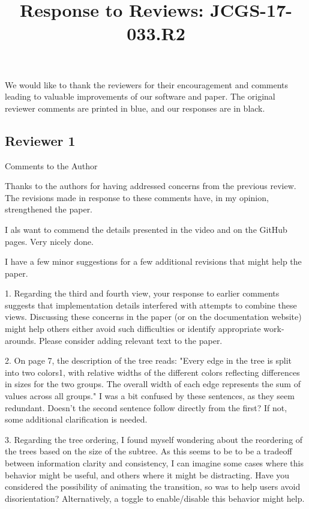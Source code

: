 \documentclass{article}
\title{Response to Reviews: JCGS-17-033.R2}
\begin{document}
\maketitle

We would like to thank the reviewers for their encouragement and comments
leading to valuable improvements of our software and paper. The original
reviewer comments are printed in blue, and our responses are in black.

\subsection{Reviewer 1}
\label{subsec:reviewer_1}

\color{blue}
Comments to the Author

Thanks to the authors for having addressed concerns from the previous review.
The revisions made in response to these comments have, in my opinion,
strengthened the paper.

I als want to commend the details presented in the video and on the GitHub
pages. Very nicely done.

I have a few minor suggestions for a few additional revisions that might help
the paper.

1. Regarding the third and fourth view, your response to earlier comments
suggests that implementation details interfered with attempts to combine these
views. Discussing these concerns in the paper (or on the documentation website)
might help others either avoid such difficulties or identify appropriate
work-arounds. Please consider adding relevant text to the paper.

\color{black}

\color{blue}
2. On page 7, the description of the tree reads: "Every edge in the tree is
split into two colors1, with relative widths of the different colors reflecting
differences in sizes for the two groups. The overall width of each edge
represents the sum of values across all groups." I was a bit confused by these
sentences, as they seem redundant. Doesn't the second sentence follow directly
from the first? If not, some additional clarification is needed.

\color{black}

\color{blue}
3. Regarding the tree ordering, I found myself wondering about the reordering of
the trees based on the size of the subtree. As this seems to be to be a tradeoff
between information clarity and consistency, I can imagine some cases where this
behavior might be useful, and others where it might be distracting. Have you
considered the possibility of animating the transition, so was to help users
avoid disorientation? Alternatively, a toggle to enable/disable this behavior
might help.
\end{document}
